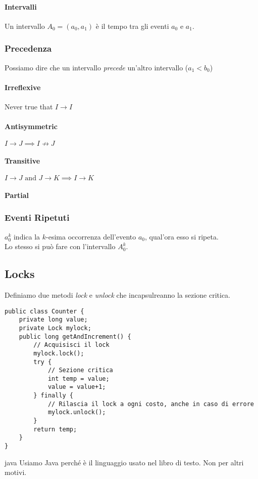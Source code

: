\documentclass{article}
\begin{document}
\paragraph{Intervalli}
Un intervallo $A_0=(a_0,a_1)$ è il tempo tra gli eventi $a_0$ e $a_1$.

\subsubsection{Precedenza}
Possiamo dire che un intervallo \textit{precede} un'altro intervallo ($a_1 < b_0$)
\paragraph{Irreflexive} Never true that $I\to I$
\paragraph{Antisymmetric} $I\to J \implies I\not\to J$
\paragraph{Transitive} $I\to J \text{ and } J \to K \implies I\to K$
\paragraph{Partial} 

\subsubsection{Eventi Ripetuti}
$a_0^k$ indica la $k$-esima occorrenza dell'evento $a_0$, qual'ora esso si ripeta. \\
Lo stesso si può fare con l'intervallo $A_0^k$.

\subsection{Locks}
Definiamo due metodi \textit{lock} e \textit{unlock} che incapsulreanno la sezione critica.
\begin{lstlisting}
public class Counter {
    private long value;
    private Lock mylock;
    public long getAndIncrement() {
        // Acquisisci il lock
        mylock.lock();
        try {
            // Sezione critica
            int temp = value;
            value = value+1;
        } finally {
            // Rilascia il lock a ogni costo, anche in caso di errore
            mylock.unlock();
        }
        return temp;
    }
}
\end{lstlisting}
\begin{callout}{java}
    Usiamo Java perché è il linguaggio usato nel libro di testo. Non per altri motivi.
\end{callout}
\end{document}
